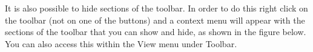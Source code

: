 It is also possible to hide sections of the toolbar. In order to do this right click on the toolbar (not on one of the buttons) and a context menu will appear with the sections of the toolbar that you can show and hide, as shown in the figure below. You can also access this within the View menu under Toolbar.

